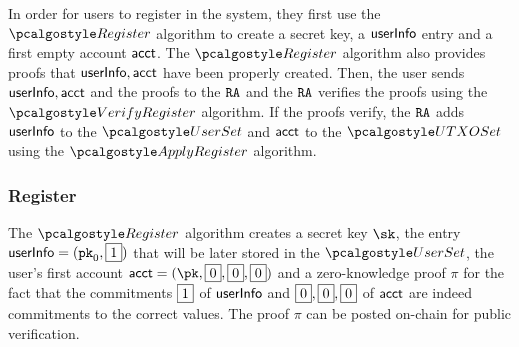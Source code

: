 
In order for users to register in the system, they first use the $\reg$ algorithm to create a secret key, a $\textup{\textsf{userInfo}}$ entry and a first empty account $\textup{\textsf{acct}}$. The $\reg$ algorithm also provides proofs that $\textup{\textsf{userInfo}}, \textup{\textsf{acct}}$ have been properly created. Then, the user sends $\textup{\textsf{userInfo}}, \textup{\textsf{acct}}$ and the proofs to the $\textup{\texttt{{RA}}}$ and the $\textup{\texttt{{RA}}}$ verifies the proofs using the $\verreg$ algorithm. If the proofs verify, the $\textup{\texttt{{RA}}}$ adds $\textup{\textsf{userInfo}}$ to the $\usersset$ and $\textup{\textsf{acct}}$ to the $\utxoset$ using the $\applyreg$ algorithm.




\subsubsection{Register}
The $\reg$ algorithm 
creates a secret key $\sk$, the entry 
$\textup{\textsf{userInfo}} = (\textup{\texttt{pk}}_{0}, \fbox{$1$})$ that will be later stored in the $\usersset$, the user's first account $\acct = (\pk, \comm{0}, \comm{0}, \comm{0})$ and a zero-knowledge proof $\pi$ for the fact that the commitments $\fbox{$1$}$ of $\textup{\textsf{userInfo}}$ and $\fbox{$0$}, \fbox{$0$}, \fbox{$0$}$ of $\textup{\textsf{acct}}$ are indeed commitments to the correct values. 
The proof $\pi$  can be posted on-chain for public verification. 

